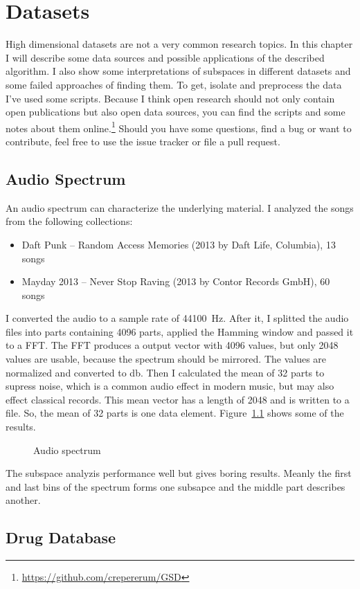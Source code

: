 \documentclass[%
	fontsize=11pt,%
	paper=a4,%
	pagesize,%
	twoside=false,%
	listof=totoc,%
	draft%
]{scrbook}
\newcommand*\circled[1]{\tikz[baseline={($(char.south) + (0,0.5pt)$)}]{
	\node[shape=circle,draw,inner sep=0.5pt,font=\tiny,thick] (char) {\textsf{#1}};}}
\begin{document}
\chapter{Datasets}
High dimensional datasets are not a very common research topics. In this chapter I will describe some data sources and possible applications of the described algorithm. I also show some interpretations of subspaces in different datasets and some failed approaches of finding them. To get, isolate and preprocess the data I've used some scripts. Because I think open research should not only contain open publications but also open data sources, you can find the scripts and some notes about them online.\footnote{\url{https://github.com/crepererum/GSD}} Should you have some questions, find a bug or want to contribute, feel free to use the issue tracker or file a pull request.

\section{Audio Spectrum}
An audio spectrum can characterize the underlying material. I analyzed the songs from the following collections:
\begin{itemize}
	\item Daft Punk -- Random Access Memories (\circled{P}2013 by Daft Life, Columbia), \num{13} songs
	\item Mayday 2013 -- Never Stop Raving (\circled{C}2013 by Contor Records GmbH), \num{60} songs
\end{itemize}
I converted the audio to a sample rate of \SI{44100}{\hertz}. After it, I splitted the audio files into parts containing \num{4096} parts, applied the Hamming window and passed it to a FFT. The FFT produces a output vector with \num{4096} values, but only \num{2048} values are usable, because the spectrum should be mirrored. The values are normalized and converted to \si{\decibel}. Then I calculated the mean of \num{32} parts to supress noise, which is a common audio effect in modern music, but may also effect classical records. This mean vector has a length of \num{2048} and is written to a file. So, the mean of \num{32} parts is one data element. Figure~\ref{fig:audio} shows some of the results.
\begin{figure}
	
	\caption{Audio spectrum}
	\label{fig:audio}
\end{figure}

The subspace analyzis performance well but gives boring results. Meanly the first and last bins of the spectrum forms one subsapce and the middle part describes another.

\section{Drug Database}


\appendix


\backmatter

\listoffigures

\printglossaries

\cleardoublepage
{}
{}
\printbibliography
\end{document}
